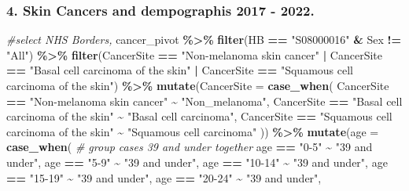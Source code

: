 \documentclass[
]{article}
\newenvironment{Shaded}{\begin{snugshade}}{\end{snugshade}}
\newcommand{\AttributeTok}[1]{\textcolor[rgb]{0.13,0.29,0.53}{#1}}
\newcommand{\CommentTok}[1]{\textcolor[rgb]{0.56,0.35,0.01}{\textit{#1}}}
\newcommand{\FunctionTok}[1]{\textcolor[rgb]{0.13,0.29,0.53}{\textbf{#1}}}
\newcommand{\NormalTok}[1]{#1}
\newcommand{\SpecialCharTok}[1]{\textcolor[rgb]{0.81,0.36,0.00}{\textbf{#1}}}
\newcommand{\StringTok}[1]{\textcolor[rgb]{0.31,0.60,0.02}{#1}}
\begin{document}
\hypertarget{skin-cancers-and-dempographis-2017---2022.}{%
\subsubsection{4. Skin Cancers and dempographis 2017 -
2022.}\label{skin-cancers-and-dempographis-2017---2022.}}

\begin{Shaded}
\begin{Highlighting}[]
\CommentTok{\#select NHS Borders, }
\NormalTok{cancer\_pivot }\SpecialCharTok{\%\textgreater{}\%}  
  \FunctionTok{filter}\NormalTok{(HB }\SpecialCharTok{==} \StringTok{"S08000016"} \SpecialCharTok{\&} 
\NormalTok{         Sex }\SpecialCharTok{!=} \StringTok{"All"}\NormalTok{) }\SpecialCharTok{\%\textgreater{}\%} 
  \FunctionTok{filter}\NormalTok{(CancerSite }\SpecialCharTok{==} \StringTok{"Non{-}melanoma skin cancer"} \SpecialCharTok{|} 
\NormalTok{         CancerSite }\SpecialCharTok{==} \StringTok{"Basal cell carcinoma of the skin"} \SpecialCharTok{|} 
\NormalTok{        CancerSite }\SpecialCharTok{==} \StringTok{"Squamous cell carcinoma of the skin"}\NormalTok{) }\SpecialCharTok{\%\textgreater{}\%}
  \FunctionTok{mutate}\NormalTok{(}\AttributeTok{CancerSite =} \FunctionTok{case\_when}\NormalTok{(}
\NormalTok{    CancerSite }\SpecialCharTok{==} \StringTok{"Non{-}melanoma skin cancer"} \SpecialCharTok{\textasciitilde{}} \StringTok{"Non\_melanoma"}\NormalTok{,}
\NormalTok{    CancerSite }\SpecialCharTok{==} \StringTok{"Basal cell carcinoma of the skin"} \SpecialCharTok{\textasciitilde{}} \StringTok{"Basal cell carcinoma"}\NormalTok{,}
\NormalTok{    CancerSite }\SpecialCharTok{==} \StringTok{"Squamous cell carcinoma of the skin"} \SpecialCharTok{\textasciitilde{}} \StringTok{"Squamous cell carcinoma"}
\NormalTok{  )) }\SpecialCharTok{\%\textgreater{}\%} 
  \FunctionTok{mutate}\NormalTok{(}\AttributeTok{age =} \FunctionTok{case\_when}\NormalTok{( }\CommentTok{\# group cases 39 and under together}
\NormalTok{   age }\SpecialCharTok{==} \StringTok{"0{-}5"} \SpecialCharTok{\textasciitilde{}} \StringTok{"39 and under"}\NormalTok{,}
\NormalTok{   age }\SpecialCharTok{==} \StringTok{"5{-}9"} \SpecialCharTok{\textasciitilde{}} \StringTok{"39 and under"}\NormalTok{,}
\NormalTok{   age }\SpecialCharTok{==} \StringTok{"10{-}14"} \SpecialCharTok{\textasciitilde{}} \StringTok{"39 and under"}\NormalTok{,}
\NormalTok{   age }\SpecialCharTok{==} \StringTok{"15{-}19"} \SpecialCharTok{\textasciitilde{}} \StringTok{"39 and under"}\NormalTok{,}
\NormalTok{   age }\SpecialCharTok{==} \StringTok{"20{-}24"} \SpecialCharTok{\textasciitilde{}} \StringTok{"39 and under"}\NormalTok{,}

\end{Highlighting}
\end{Shaded}
\end{document}
